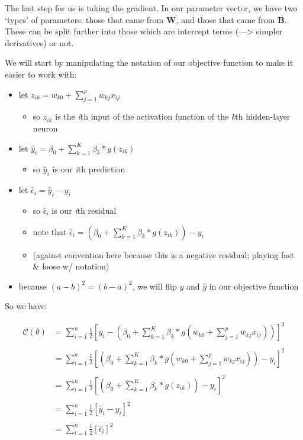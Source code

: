 \documentclass[
]{book}
\providecommand{\tightlist}{%
  \setlength{\itemsep}{0pt}\setlength{\parskip}{0pt}}
\begin{document}
The last step for us is taking the gradient. In our parameter vector, we have two `types' of parameters: those that came from \textbf{W}, and those that came from \textbf{B}. These can be split further into those which are intercept terms (---\textgreater{} simpler derivatives) or not.

We will start by manipulating the notation of our objective function to make it easier to work with:

\begin{itemize}
\tightlist
\item
  let \(z_{ik} = w_{k0} + \sum_{j = 1}^p w_{kj} x_{ij}\)

  \begin{itemize}
  \tightlist
  \item
    so \(z_{ik}\) is the \emph{i}th input of the activation function of the \emph{k}th hidden-layer neuron
  \end{itemize}
\item
  let \(\hat y_i = \beta_0 + \sum_{k = 1}^K \beta_k * g(z_{ik})\)

  \begin{itemize}
  \tightlist
  \item
    so \(\hat y_i\) is our \emph{i}th prediction
  \end{itemize}
\item
  let \(\hat \epsilon_i = \hat y_i - y_i\)

  \begin{itemize}
  \tightlist
  \item
    so \(\hat \epsilon_i\) is our \emph{i}th residual
  \item
    note that \(\hat \epsilon_i = \left(\beta_0 + \sum_{k = 1}^K \beta_k * g(z_{ik})\right) - y_i\)
  \item
    (against convention here because this is a negative residual; playing fast \& loose w/ notation)
  \end{itemize}
\item
  because \((a - b)^2 = (b - a)^2\), we will flip \(y\) and \(\hat y\) in our objective function
\end{itemize}

So we have:

\[
\begin{aligned}
\mathcal{C} (\theta) &= \sum_{i = 1}^n \frac{1}{2} \left[y_i - \left(\beta_0 + \sum_{k = 1}^K \beta_k * g(w_{k0} + \sum_{j = 1}^p w_{kj} x_{ij})\right)\right]^2 \\ \\
&= \sum_{i = 1}^n \frac{1}{2} \left[\left(\beta_0 + \sum_{k = 1}^K \beta_k * g(w_{k0} + \sum_{j = 1}^p w_{kj} x_{ij})\right) - y_i\right]^2 \\ \\
&= \sum_{i = 1}^n \frac{1}{2} \left[\left(\beta_0 + \sum_{k = 1}^K \beta_k * g(z_{ik})\right) - y_i\right]^2 \\ \\
&= \sum_{i = 1}^n \frac{1}{2} \left[\hat y_i - y_i\right]^2 \\ \\
&= \sum_{i = 1}^n \frac{1}{2} \left[\hat \epsilon_i\right]^2
\end{aligned}
\]
\end{document}
